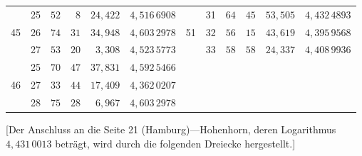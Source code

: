 \begin{center}
\begin{tabular}{|c|c|r@{\;}r@{\;}r|c||c|c|r@{\;}r@{\;}r|c|}
 & 25 & $52$ & $8$ & $24{,}422$ & $4{,}516\,6908$ &  & 31 & $64$ & $45$ & $53{,}505$ & $4{,}432\,4893$\\
45 & 26 & $74$ & $31$ & $34{,}948$ & $4{,}603\,2978$ & 51 & 32 & $56$ & $15$ & $43{,}619$ & $4{,}395\,9568$\\
 & 27 & $53$ & $20$ & $3{,}308$ & $4{,}523\,5773$ &  & 33 & $58$ & $58$ & $24{,}337$ & $4{,}408\,9936$\\[3pt]
 & 25 & $70$ & $47$ & $37{,}831$ & $4{,}592\,5466$ &  &  &  &  &  & \\
46 & 27 & $33$ & $44$ & $17{,}409$ & $4{,}362\,0207$ &  &  &  &  &  & \\
 & 28 & $75$ & $28$ & $6{,}967$ & $4{,}603\,2978$ &  &  &  &  &  & \\
\end{tabular}\end{center}

[Der Anschluss an die Seite 21 (Hamburg)---Hohenhorn, deren Logarithmus
$4{,}431\,0013$ beträgt, wird durch die folgenden Dreiecke hergestellt.]

